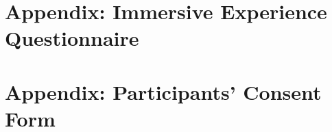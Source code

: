\documentclass[12pt,twoside,english]{article}
\begin{document}

% 


\appendix
\section{Appendix: Immersive Experience Questionnaire}
\label{sect:appendix}
\label{sect:ieq}

\section{Appendix: Participants' Consent Form}
\label{sect:consent-form}

\clearpage
\end{document}
